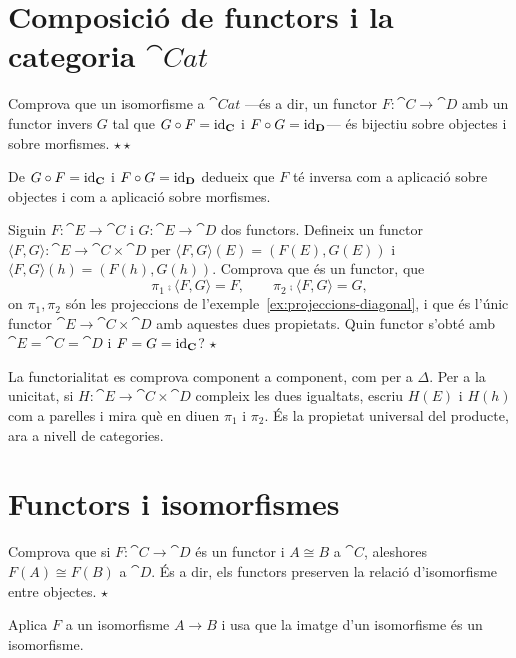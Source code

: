 \section{Composició de functors i la categoria \texorpdfstring{$\cat{Cat}$}{Cat}}

\begin{exercici}
Comprova que un isomorfisme a $\cat{Cat}$ ---és a dir, un functor $F\colon\cat{C}\to\cat{D}$ amb un functor invers $G$ tal que $G\circ F=\operatorname{id}_{\mathbf{C}}$ i $F\circ G=\operatorname{id}_{\mathbf{D}}$--- és bijectiu sobre objectes i sobre morfismes. \hfill{\normalfont$\star\star$}
\begin{indicacio}
De $G\circ F=\operatorname{id}_{\mathbf{C}}$ i $F\circ G=\operatorname{id}_{\mathbf{D}}$ dedueix que $F$ té inversa com a aplicació sobre objectes i com a aplicació sobre morfismes.
\end{indicacio}
\end{exercici}

\begin{exercici}
Siguin $F\colon\cat{E}\to\cat{C}$ i $G\colon\cat{E}\to\cat{D}$ dos functors. Defineix un functor $\langle F,G\rangle\colon\cat{E}\to\cat{C}\times\cat{D}$ per $\langle F,G\rangle(E)=(F(E),G(E))$ i $\langle F,G\rangle(h)=(F(h),G(h))$. Comprova que és un functor, que
\[
\pi_1\comp\langle F,G\rangle=F,\qquad \pi_2\comp\langle F,G\rangle=G,
\]
on $\pi_1,\pi_2$ són les projeccions de l'exemple~\ref{ex:projeccions-diagonal}, i que és l'únic functor $\cat{E}\to\cat{C}\times\cat{D}$ amb aquestes dues propietats. Quin functor s'obté amb $\cat{E}=\cat{C}=\cat{D}$ i $F=G=\operatorname{id}_{\mathbf{C}}$? \hfill{\normalfont$\star$}
\begin{indicacio}
La functorialitat es comprova component a component, com per a $\Delta$. Per a la unicitat, si $H\colon\cat{E}\to\cat{C}\times\cat{D}$ compleix les dues igualtats, escriu $H(E)$ i $H(h)$ com a parelles i mira què en diuen $\pi_1$ i $\pi_2$. És la propietat universal del producte, ara a nivell de categories.
\end{indicacio}
\end{exercici}

\section{Functors i isomorfismes}

\begin{exercici}
Comprova que si $F\colon\cat{C}\to\cat{D}$ és un functor i $A\cong B$ a $\cat{C}$, aleshores $F(A)\cong F(B)$ a $\cat{D}$. És a dir, els functors preserven la relació d'isomorfisme entre objectes. \hfill{\normalfont$\star$}
\begin{indicacio}
Aplica $F$ a un isomorfisme $A\to B$ i usa que la imatge d'un isomorfisme és un isomorfisme.
\end{indicacio}
\end{exercici}

